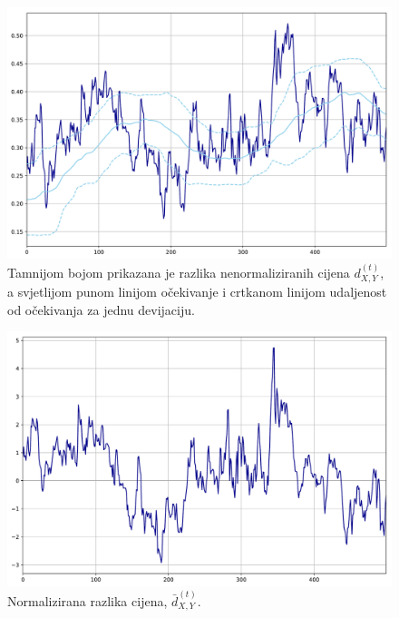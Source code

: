 \documentclass[lmodern, utf8, diplomski, numeric]{fer}
\newcommand{\norm}[1]{\bar{#1}}
\newcommand{\q}{\left}
\newcommand{\w}{\right}
\begin{document}
  \begin{figure}[H]
    \centering
    \includegraphics[width=1.0\linewidth]{graphics/diff.pdf}
    \caption{Tamnijom bojom prikazana je razlika nenormaliziranih cijena $d_{X,Y}^{(t)}$, a svjetlijom punom linijom očekivanje i crtkanom linijom udaljenost od očekivanja za jednu devijaciju.}
    \label{fig:diff}
  \end{figure}

  \begin{figure}[H]
    \centering
    \includegraphics[width=1.0\linewidth]{graphics/diff-norm.pdf}
    \caption{
      Normalizirana razlika cijena, $\norm{d}_{X,Y}^{\q(t\w)}$.}
    \label{fig:diff-norm}
  \end{figure}
  
\end{document}
